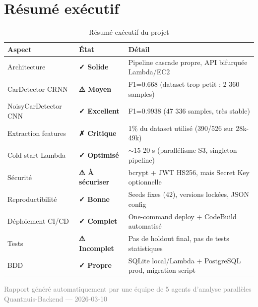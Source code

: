 \documentclass[11pt,a4paper]{article}
\newcommand{\critical}[1]{\textcolor{dangertext}{\textbf{#1}}}
\newcommand{\ok}[1]{\textcolor{green!50!black}{\textbf{#1}}}
\newcommand{\warn}[1]{\textcolor{orange!70!black}{\textbf{#1}}}
\begin{document}
\section*{Résumé exécutif}

\begin{table}[htbp]
\centering
\begin{tabular}{@{}lll@{}}
\toprule
\textbf{Aspect} & \textbf{État} & \textbf{Détail} \\
\midrule
Architecture & \ok{✓ Solide} & Pipeline cascade propre, API bifurquée Lambda/EC2 \\
CarDetector CRNN & \warn{⚠ Moyen} & F1=0.668 (dataset trop petit : 2 360 samples) \\
NoisyCarDetector CNN & \ok{✓ Excellent} & F1=0.9938 (47 336 samples, très stable) \\
Extraction features & \critical{✗ Critique} & 1\% du dataset utilisé (390/526 sur 28k-49k) \\
Cold start Lambda & \ok{✓ Optimisé} & $\sim$15-20 s (parallélisme S3, singleton pipeline) \\
Sécurité & \warn{⚠ À sécuriser} & bcrypt + JWT HS256, mais Secret Key optionnelle \\
Reproductibilité & \ok{✓ Bonne} & Seeds fixes (42), versions lockées, JSON config \\
Déploiement CI/CD & \ok{✓ Complet} & One-command deploy + CodeBuild automatisé \\
Tests & \warn{⚠ Incomplet} & Pas de holdout final, pas de tests statistiques \\
BDD & \ok{✓ Propre} & SQLite local/Lambda + PostgreSQL prod, migration script \\
\bottomrule
\end{tabular}
\caption{Résumé exécutif du projet}
\end{table}

\vfill
\begin{center}
  \small\textcolor{gray}{
    Rapport généré automatiquement par une équipe de 5 agents d'analyse parallèles\\
    Quantnuis-Backend — 2026-03-10
  }
\end{center}
\end{document}
